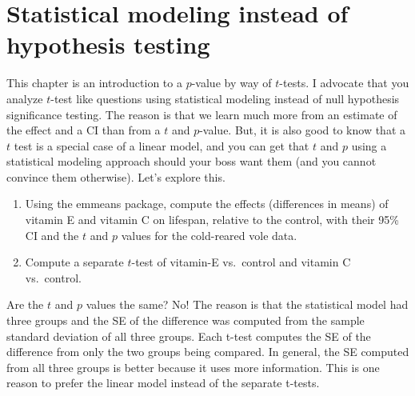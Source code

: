 \documentclass[]{book}
\providecommand{\tightlist}{%
  \setlength{\itemsep}{0pt}\setlength{\parskip}{0pt}}
\theoremstyle{definition}
\theoremstyle{definition}
\theoremstyle{definition}
\theoremstyle{remark}
\begin{document}
\section{Statistical modeling instead of hypothesis
testing}\label{statistical-modeling-instead-of-hypothesis-testing}

This chapter is an introduction to a \(p\)-value by way of \(t\)-tests.
I advocate that you analyze \(t\)-test like questions using statistical
modeling instead of null hypothesis significance testing. The reason is
that we learn much more from an estimate of the effect and a CI than
from a \(t\) and \(p\)-value. But, it is also good to know that a \(t\)
test is a special case of a linear model, and you can get that \(t\) and
\(p\) using a statistical modeling approach should your boss want them
(and you cannot convince them otherwise). Let's explore this.

\begin{enumerate}
\def\labelenumi{\arabic{enumi}.}
\tightlist
\item
  Using the emmeans package, compute the effects (differences in means)
  of vitamin E and vitamin C on lifespan, relative to the control, with
  their 95\% CI and the \(t\) and \(p\) values for the cold-reared vole
  data.
\item
  Compute a separate \(t\)-test of vitamin-E vs.~control and vitamin C
  vs.~control.
\end{enumerate}

Are the \(t\) and \(p\) values the same? No! The reason is that the
statistical model had three groups and the SE of the difference was
computed from the sample standard deviation of all three groups. Each
t-test computes the SE of the difference from only the two groups being
compared. In general, the SE computed from all three groups is better
because it uses more information. This is one reason to prefer the
linear model instead of the separate t-tests.
\end{document}
